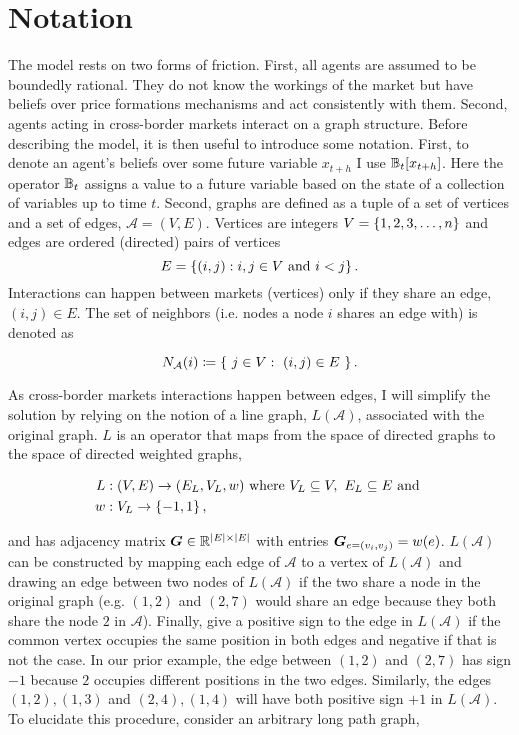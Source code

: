 \section{Notation}
The model rests on two forms of friction. First, all agents are assumed to be boundedly rational. They do not know the workings of the market but have beliefs over price formations mechanisms and act consistently with them. Second, agents acting in cross-border markets interact on a graph structure. Before describing the model, it is then useful to introduce some notation. First, to denote an agent's beliefs over some future variable $x_{t+h}$ I use $\mathbb{B}_t[x_{t+h}]$. Here the operator $\mathbb{B}_t$ assigns a value to a future variable based on the state of a collection of variables up to time $t$. Second, graphs are defined as a tuple of a set of vertices and a set of edges, $\mathcal{A} = (V, E)$. Vertices are integers $V = \left\{1, 2, 3, \ldots, n\right\}$ and edges are ordered (directed) pairs of vertices \begin{equation*}E = \left\{(i, j) : i, j \in V \text{ and } i < j\right\}.\end{equation*} Interactions can happen between markets (vertices) only if they share an edge, $(i, j) \in E$. The set of neighbors (i.e. nodes a node $i$ shares an edge with) is denoted as

\begin{equation}
  N_{\mathcal{A}}(i) \coloneqq \left\{ \ j \in V: \ (i, j) \in E \ \right\}.
\end{equation}


As cross-border markets interactions happen between edges, I will simplify the solution by relying on the notion of a line graph, $L(\mathcal{A})$, associated with the original graph. $L$ is an operator that maps from the space of directed graphs to the space of directed weighted graphs,

\begin{equation}
  \begin{split}
    L&: (V, E) \to (E_{L}, V_{L}, w) \text{ where } V_{L}\subseteq V, \ E_{L}\subseteq E \text{ and } \\
    w&: V_{L} \to \left\{-1, 1\right\},
  \end{split}
\end{equation}


and has adjacency matrix $\bm{G} \in \mathbb{R}^{\lvert E\rvert\times \lvert E\rvert}$ with entries $\bm{G}_{e = (v_i, v_j)} = w(e)$. $L(\mathcal{A})$ can be constructed by mapping each edge of $\mathcal{A}$ to a vertex of $L(\mathcal{A})$ and drawing an edge between two nodes of $L(\mathcal{A})$ if the two share a node in the original graph (e.g. $(1, 2)$ and $(2, 7)$ would share an edge because they both share the node $2$ in $\mathcal{A}$). Finally, give a positive sign to the edge in $L(\mathcal{A})$ if the common vertex occupies the same position in both edges and negative if that is not the case. In our prior example, the edge between $(1, 2)$ and $(2, 7)$ has sign $-1$ because $2$ occupies different positions in the two edges. Similarly, the edges $(1, 2), (1, 3)$ and $(2, 4), (1, 4)$ will have both positive sign $+1$ in $L(\mathcal{A})$. To elucidate this procedure, consider an arbitrary long path graph,

